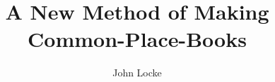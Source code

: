 \documentclass[10pt, a6paper, oneside]{book}
\title{A New Method of Making Common-Place-Books}
\author{John Locke}
\begin{document}
\sloppy


\end{document}
